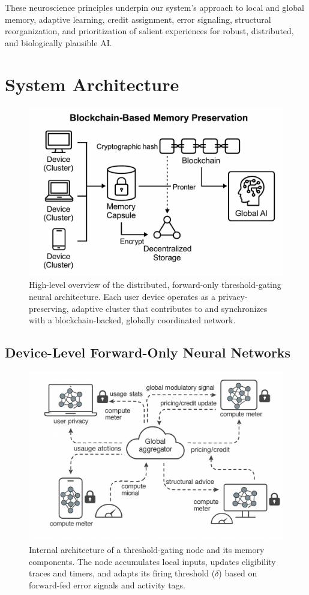 \documentclass[11pt]{article}
\begin{document}
These neuroscience principles underpin our system’s approach to local and global memory, adaptive learning, credit assignment, error signaling, structural reorganization, and prioritization of salient experiences for robust, distributed, and biologically plausible AI.

\section{System Architecture}

\begin{figure}[ht]
    \centering
    \includegraphics[width=0.76\linewidth]{architecture_diagrams/6f6cd4fd-81a1-4ae3-be8c-6fd34920efe3.png}
    \caption{
        High-level overview of the distributed, forward-only threshold-gating neural architecture. Each user device operates as a privacy-preserving, adaptive cluster that contributes to and synchronizes with a blockchain-backed, globally coordinated network.
    }
    \label{fig:high-level-architecture}
\end{figure}

\subsection{Device-Level Forward-Only Neural Networks}
\begin{figure}[ht]
    \centering
    \includegraphics[width=0.68\linewidth]{architecture_diagrams/48db0a56-63a0-40ef-9322-787cc6e465d9.png}
    \caption{
        Internal architecture of a threshold-gating node and its memory components. The node accumulates local inputs, updates eligibility traces and timers, and adapts its firing threshold (\(\delta\)) based on forward-fed error signals and activity tags.
    }
    \label{fig:node-internal-architecture}
\end{figure}
\end{document}
